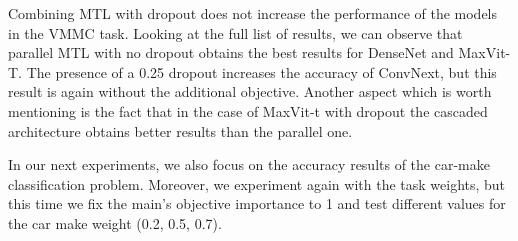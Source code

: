 \documentclass[conference]{IEEEtran}
\begin{document}
Combining MTL with dropout does not increase the performance of the models in the VMMC task. Looking at the full list of results, we can observe that parallel MTL with no dropout obtains the best results for DenseNet and MaxVit-T. The presence of a 0.25 dropout increases the accuracy of ConvNext, but this result is again without the additional objective. Another aspect which is worth mentioning is the fact that in the case of MaxVit-t with dropout the cascaded architecture obtains better results than the parallel one.

In our next experiments, we also focus on the accuracy results of the car-make classification problem. Moreover, we experiment again with the task weights, but this time we fix the main's objective importance to 1 and test different values for the car make weight (0.2, 0.5, 0.7).


\newcommand{\multilinecell}[1]{%
    \begin{tabular}{@{}c@{}} #1 \end{tabular}%
}


\end{document}
